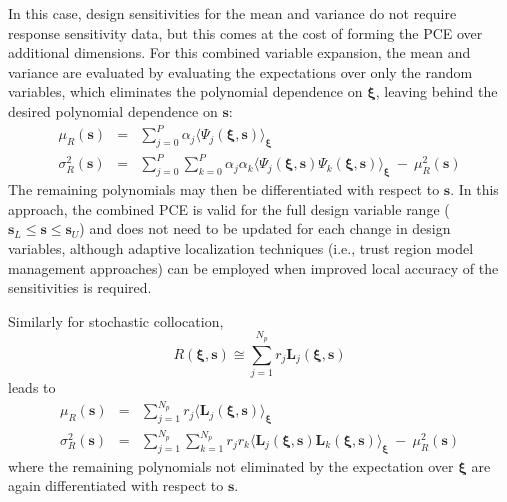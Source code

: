 \noindent In this case, design sensitivities for the mean and variance 
do not require response sensitivity data, but this comes at the cost
of forming the PCE over additional dimensions.  For this combined
variable expansion, the mean and variance are evaluated by evaluating
the expectations over only the random variables, which eliminates the
polynomial dependence on $\boldsymbol{\xi}$, leaving behind the
desired polynomial dependence on $\boldsymbol{s}$:
\begin{eqnarray}
\mu_R(\boldsymbol{s}) &=& \sum_{j=0}^P \alpha_j \langle \Psi_j(\boldsymbol{\xi},
\boldsymbol{s}) \rangle_{\boldsymbol{\xi}} \label{eq:muR_comb_pce} \\
\sigma^2_R(\boldsymbol{s}) &=& \sum_{j=0}^P \sum_{k=0}^P \alpha_j \alpha_k 
\langle \Psi_j(\boldsymbol{\xi}, \boldsymbol{s}) \Psi_k(\boldsymbol{\xi},
\boldsymbol{s}) \rangle_{\boldsymbol{\xi}} ~-~ \mu^2_R(\boldsymbol{s})
\label{eq:sigR_comb_pce}
\end{eqnarray}
The remaining polynomials may then be differentiated with respect to
$\boldsymbol{s}$. %
In this approach, the combined PCE is valid for the full design
variable range ($\boldsymbol{s}_L \le \boldsymbol{s} \le \boldsymbol{s}_U$)
and does not need to be updated for each change in design variables,
although adaptive localization techniques (i.e., trust region model
management approaches) can be employed when improved local accuracy of
the sensitivities is required.

Similarly for stochastic collocation,
\begin{equation}
R(\boldsymbol{\xi}, \boldsymbol{s}) \cong \sum_{j=1}^{N_p} r_j 
\boldsymbol{L}_j(\boldsymbol{\xi}, \boldsymbol{s}) \label{eq:R_r_L_xi_s}
\end{equation}
leads to
\begin{eqnarray}
\mu_R(\boldsymbol{s}) &=& \sum_{j=1}^{N_p} r_j \langle 
\boldsymbol{L}_j(\boldsymbol{\xi}, \boldsymbol{s}) \rangle_{\boldsymbol{\xi}} 
\label{eq:muR_both_sc} \\
\sigma^2_R(\boldsymbol{s}) &=& \sum_{j=1}^{N_p} \sum_{k=1}^{N_p} r_j r_k 
\langle \boldsymbol{L}_j(\boldsymbol{\xi}, \boldsymbol{s}) 
\boldsymbol{L}_k(\boldsymbol{\xi}, \boldsymbol{s}) \rangle_{\boldsymbol{\xi}}
~-~ \mu^2_R(\boldsymbol{s}) \label{eq:sigR_both_sc}
\end{eqnarray}
where the remaining polynomials not eliminated by the expectation over
$\boldsymbol{\xi}$ are again differentiated with respect to $\boldsymbol{s}$.

